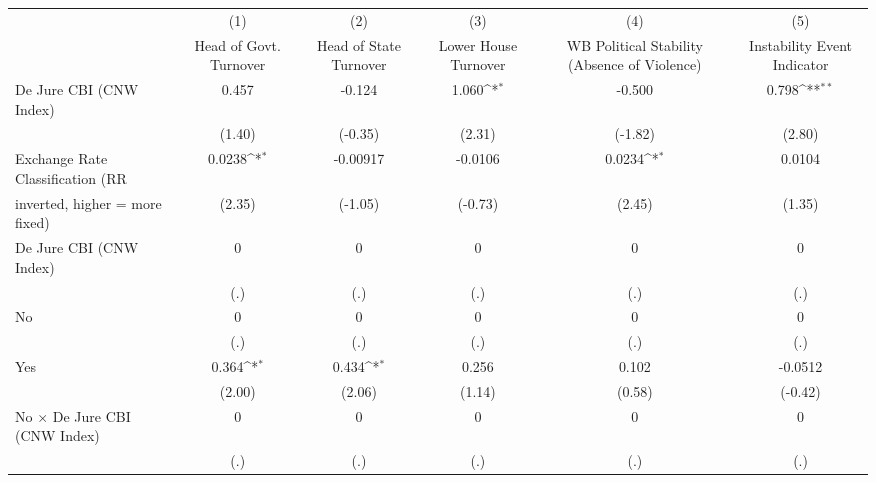 {
\def\sym#1{\ifmmode^{#1}\else\(^{#1}\)\fi}
\begin{tabular}{l*{5}{c}}
\toprule
                                        &\multicolumn{1}{c}{(1)}&\multicolumn{1}{c}{(2)}&\multicolumn{1}{c}{(3)}&\multicolumn{1}{c}{(4)}&\multicolumn{1}{c}{(5)}\\
                                        &\multicolumn{1}{c}{Head of Govt. Turnover}&\multicolumn{1}{c}{Head of State Turnover}&\multicolumn{1}{c}{Lower House Turnover}&\multicolumn{1}{c}{WB Political Stability (Absence of Violence)}&\multicolumn{1}{c}{Instability Event Indicator}\\
\midrule
De Jure CBI (CNW Index)                 &0.457         &-0.124         &1.060\sym{*}  &-0.500         &0.798\sym{**} \\
                                        &(1.40)         &(-0.35)         &(2.31)         &(-1.82)         &(2.80)         \\
\addlinespace
Exchange Rate Classification (RR        &0.0238\sym{*}  &-0.00917         &-0.0106         &0.0234\sym{*}  &0.0104         \\
inverted, higher = more fixed)          &(2.35)         &(-1.05)         &(-0.73)         &(2.45)         &(1.35)         \\
\addlinespace
De Jure CBI (CNW Index)                 &    0         &    0         &    0         &    0         &    0         \\
                                        &  (.)         &  (.)         &  (.)         &  (.)         &  (.)         \\
\addlinespace
No                                      &    0         &    0         &    0         &    0         &    0         \\
                                        &  (.)         &  (.)         &  (.)         &  (.)         &  (.)         \\
\addlinespace
Yes                                     &0.364\sym{*}  &0.434\sym{*}  &0.256         &0.102         &-0.0512         \\
                                        &(2.00)         &(2.06)         &(1.14)         &(0.58)         &(-0.42)         \\
\addlinespace
No $\times$ De Jure CBI (CNW Index)     &    0         &    0         &    0         &    0         &    0         \\
                                        &  (.)         &  (.)         &  (.)         &  (.)         &  (.)         \\

\end{tabular}}
